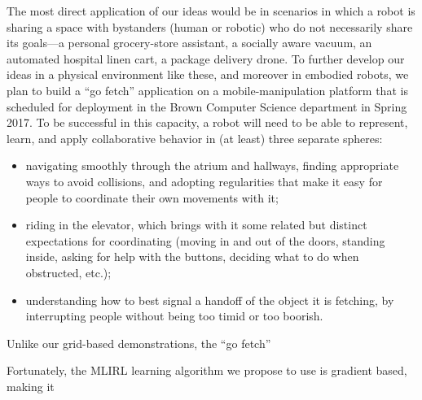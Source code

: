 The most direct application of our ideas would be in scenarios in
which a robot is sharing a space with bystanders (human or robotic)
who do not necessarily share its goals---a personal grocery-store
assistant, a socially aware vacuum, an automated hospital linen cart,
a package delivery drone.  To further develop our ideas in a physical
environment like these, and moreover in embodied robots,
we plan to build a ``go fetch'' application on a mobile-manipulation
platform that is scheduled for deployment in the Brown Computer
Science department in Spring 2017.  To be successful in this capacity,
a robot will need to be able to represent, learn, and apply
collaborative behavior in (at least) three separate spheres:

\begin{itemize}
\item navigating smoothly through the atrium and hallways, finding
  appropriate ways to avoid collisions, and adopting regularities that
  make it easy for people to coordinate their own movements with it;

\item riding in the elevator, which brings with it some related but
  distinct expectations for coordinating (moving in and out of the
  doors, standing inside, asking for help with the buttons, deciding
  what to do when obstructed, etc.);

\item understanding how to best signal a handoff of the object it is
  fetching, by interrupting people without being too timid or too
  boorish.
\end{itemize}


Unlike our grid-based demonstrations, the ``go fetch'' 

Fortunately, the MLIRL learning algorithm we propose to use is
gradient based, making it 


~\cite{silver16}



